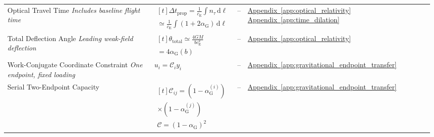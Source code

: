 \begin{longtable}{@{} p{4.5cm} p{6cm} c p{4cm} @{}}
{\raggedright Optical Travel Time \newline \textit{Includes baseline flight time}\par} & {\raggedright $\begin{gathered}[t]\Delta t_{\mathrm{prop}}=\frac1{c_{\mathrm E}}\int n_\tau\,\mathrm d\ell \\ \simeq\frac1{c_{\mathrm E}}\int(1+2\alpha_{\mathrm G})\,\mathrm d\ell\end{gathered}$\par} & -- & {\raggedright \hyperref[app:optical_relativity]{Appendix~\ref*{app:optical_relativity}} \newline \hyperref[app:time_dilation]{Appendix~\ref*{app:time_dilation}}\par} \\

{\raggedright Total Deflection Angle \newline \textit{Leading weak-field deflection}\par} & {\raggedright $\begin{gathered}[t]\theta_{\mathrm{total}}\simeq\frac{4GM}{bc_{\mathrm E}^2} \\ =4\alpha_{\mathrm G}(b)\end{gathered}$\par} & -- & {\raggedright \hyperref[app:optical_relativity]{Appendix~\ref*{app:optical_relativity}}\par} \\

{\raggedright Work-Conjugate Coordinate Constraint \newline \textit{One endpoint, fixed loading}\par} & {\raggedright $u_{i} = \mathcal{C}_{i}y_{i}$\par} & -- & {\raggedright \hyperref[app:gravitational_endpoint_transfer]{Appendix~\ref*{app:gravitational_endpoint_transfer}}\par} \\

{\raggedright Serial Two-Endpoint Capacity\par} & {\raggedright $\begin{gathered}[t]\mathcal C_{ij}=(1-\alpha_{\mathrm G}^{(i)}) \\ \times(1-\alpha_{\mathrm G}^{(j)}) \\ \mathcal C=(1-\alpha_{\mathrm G})^2\end{gathered}$\par} & -- & {\raggedright \hyperref[app:gravitational_endpoint_transfer]{Appendix~\ref*{app:gravitational_endpoint_transfer}}\par} \\


\end{longtable}
